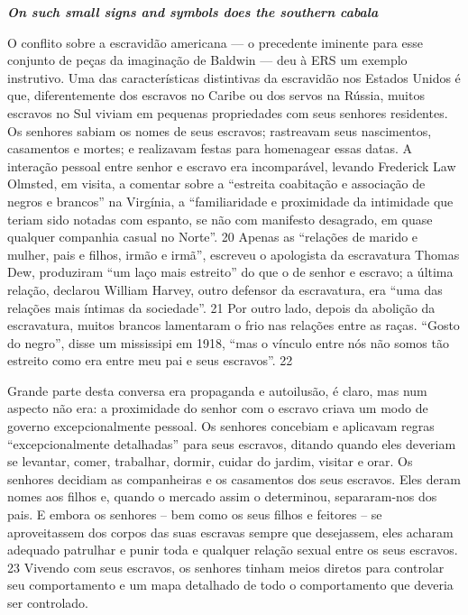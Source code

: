  
\par
 

 
\par
 

 \textbf{\textit{On such small signs and symbols does the southern cabala} }  
 
 
\par
 
O conflito sobre a escravidão americana — o precedente iminente para esse conjunto de peças da imaginação de Baldwin — deu à ERS um exemplo instrutivo. Uma das características distintivas da escravidão nos Estados Unidos é que, diferentemente dos escravos no Caribe ou dos servos na Rússia, muitos escravos no Sul viviam em pequenas propriedades com seus senhores residentes. Os senhores sabiam os nomes de seus escravos; rastreavam seus nascimentos, casamentos e mortes; e realizavam festas para homenagear essas datas. A interação pessoal entre senhor e escravo era incomparável, levando Frederick Law Olmsted, em visita, a comentar sobre a “estreita coabitação e associação de negros e brancos” na Virgínia, a “familiaridade e proximidade da intimidade que teriam sido notadas com espanto, se não com manifesto desagrado, em quase qualquer companhia casual no Norte”.
 {\color{blue} 20}  
Apenas as “relações de marido e mulher, pais e filhos, irmão e irmã”, escreveu o apologista da escravatura Thomas Dew, produziram “um laço mais estreito” do que o de senhor e escravo; a última relação, declarou William Harvey, outro defensor da escravatura, era “uma das relações mais íntimas da sociedade”.
 {\color{blue} 21}  
Por outro lado, depois da abolição da escravatura, muitos brancos lamentaram o frio nas relações entre as raças. “Gosto do negro”, disse um mississipi em 1918, “mas o vínculo entre nós não somos tão estreito como era entre meu pai e seus escravos”.
 {\color{blue} 22}  

 
\par
 
Grande parte desta conversa era propaganda e autoilusão, é claro, mas num aspecto não era: a proximidade do senhor com o escravo criava um modo de governo excepcionalmente pessoal. Os senhores concebiam e aplicavam regras “excepcionalmente detalhadas” para seus escravos, ditando quando eles deveriam se levantar, comer, trabalhar, dormir, cuidar do jardim, visitar e orar. Os senhores decidiam as companheiras e os casamentos dos seus escravos. Eles deram nomes aos filhos e, quando o mercado assim o determinou, separaram-nos dos pais. E embora os senhores – bem como os seus filhos e feitores – se aproveitassem dos corpos das suas escravas sempre que desejassem, eles acharam adequado patrulhar e punir toda e qualquer relação sexual entre os seus escravos.
 {\color{blue} 23}  
Vivendo com seus escravos, os senhores tinham meios diretos para controlar seu comportamento e um mapa detalhado de todo o comportamento que deveria ser controlado.
 
